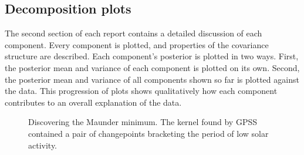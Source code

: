 \documentclass{article} %
\begin{document}


\subsection{Decomposition plots}

The second section of each report contains a detailed discussion of each component.
Every component is plotted, and properties of the covariance structure are described.
Each component's posterior is plotted in two ways.  First, the posterior mean and variance of each component is plotted on its own.  Second, the posterior mean and variance of all components shown so far is plotted against the data.  This progression of plots 
shows qualitatively how each component contributes to an overall explanation of the data.


\begin{figure}[ht]
\centering
{}
\caption{Discovering the Maunder minimum.  The kernel found by GPSS contained a pair of changepoints bracketing the period of low solar activity.}
\label{fig:maunder}
\end{figure}
\end{document}
